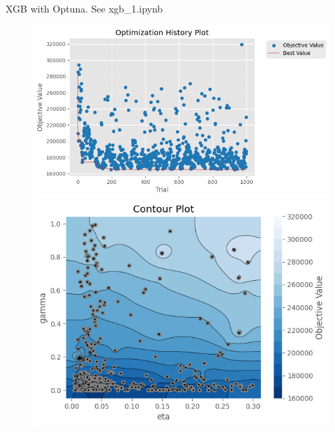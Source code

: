\documentclass{beamer}
\begin{document}
\begin{frame}{\footnotesize XGB with Optuna. See xgb\_1.ipynb}
\begin{figure}
        \begin{minipage}[t]{0.48\textwidth}
            \center
            \includegraphics[width=\linewidth]{figure/xgb_1_historyPlot.png}
        \end{minipage}
        \begin{minipage}[t]{0.48\textwidth}
            \center
            \includegraphics[width=\linewidth]{figure/xgb_1_gamma_eta.png}
        \end{minipage}
    \end{figure}
\begin{figure}
        \begin{minipage}[t]{0.48\textwidth}
            \center

\end{minipage}
\end{figure}
\end{frame}
\end{document}
